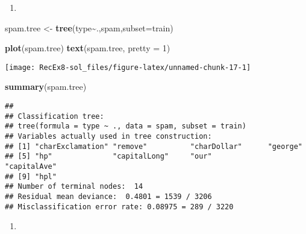 \documentclass[
]{article}
\newenvironment{Shaded}{\begin{snugshade}}{\end{snugshade}}
\newcommand{\AttributeTok}[1]{\textcolor[rgb]{0.13,0.29,0.53}{#1}}
\newcommand{\DecValTok}[1]{\textcolor[rgb]{0.00,0.00,0.81}{#1}}
\newcommand{\FunctionTok}[1]{\textcolor[rgb]{0.13,0.29,0.53}{\textbf{#1}}}
\newcommand{\NormalTok}[1]{#1}
\newcommand{\OtherTok}[1]{\textcolor[rgb]{0.56,0.35,0.01}{#1}}
\newcommand{\SpecialCharTok}[1]{\textcolor[rgb]{0.81,0.36,0.00}{\textbf{#1}}}
\newcommand{\StringTok}[1]{\textcolor[rgb]{0.31,0.60,0.02}{#1}}
\providecommand{\tightlist}{%
  \setlength{\itemsep}{0pt}\setlength{\parskip}{0pt}}
\begin{document}
\begin{enumerate}
\def\labelenumi{\alph{enumi})}
\setcounter{enumi}{2}
\tightlist
\item
\end{enumerate}

\begin{Shaded}
\begin{Highlighting}[]
\NormalTok{spam.tree }\OtherTok{\textless{}{-}} \FunctionTok{tree}\NormalTok{(type}\SpecialCharTok{\textasciitilde{}}\NormalTok{.,spam,}\AttributeTok{subset=}\NormalTok{train)}

\FunctionTok{plot}\NormalTok{(spam.tree)}
\FunctionTok{text}\NormalTok{(spam.tree, }\AttributeTok{pretty =} \DecValTok{1}\NormalTok{)}
\end{Highlighting}
\end{Shaded}

\texttt{[image: RecEx8-sol\_files/figure-latex/unnamed-chunk-17-1]}

\begin{Shaded}
\begin{Highlighting}[]
\FunctionTok{summary}\NormalTok{(spam.tree)}
\end{Highlighting}
\end{Shaded}

\begin{verbatim}
## 
## Classification tree:
## tree(formula = type ~ ., data = spam, subset = train)
## Variables actually used in tree construction:
## [1] "charExclamation" "remove"          "charDollar"      "george"         
## [5] "hp"              "capitalLong"     "our"             "capitalAve"     
## [9] "hpl"            
## Number of terminal nodes:  14 
## Residual mean deviance:  0.4801 = 1539 / 3206 
## Misclassification error rate: 0.08975 = 289 / 3220
\end{verbatim}

\begin{enumerate}
\def\labelenumi{\alph{enumi})}
\setcounter{enumi}{3}
\tightlist
\item
\end{enumerate}

\begin{Shaded}
\end{Shaded}
\end{document}
